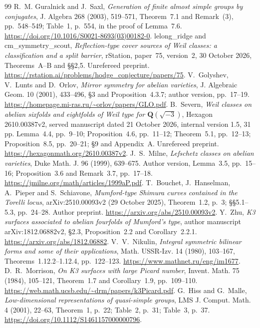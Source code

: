 \documentclass[11pt]{article}
\theoremstyle{definition}
\theoremstyle{remark}
\newcommand{\Q}{\mathbf Q}
\begin{document}
\begin{thebibliography}{99}
 R.~M. Guralnick and J.~Saxl, \emph{Generation of finite almost simple groups by conjugates}, J. Algebra 268 (2003), 519--571, Theorem~7.1 and Remark~(3), pp.~548--549; Table~1, p.~554, in the proof of Lemma~7.6. \url{https://doi.org/10.1016/S0021-8693(03)00182-0}.
 lelong\_ridge and cm\_symmetry\_scout, \emph{Reflection-type cover sources of Weil classes: a classification and a split barrier}, rStation, paper~75, version~2, 30 October 2026, Theorems~A--B and \S\S2,5. Unrefereed preprint. \url{https://rstation.ai/problems/hodge_conjecture/papers/75}.
 V.~Golyshev, V.~Lunts and D.~Orlov, \emph{Mirror symmetry for abelian varieties}, J. Algebraic Geom. 10 (2001), 433--496, \S3 and Proposition~4.3.7; author version, pp.~17--19. \url{https://homepage.mi-ras.ru/~orlov/papers/GLO.pdf}.
 B.~Severn, \emph{Weil classes on abelian sixfolds and eightfolds of Weil type for $\Q(\sqrt{-3})$}, Hexagon 2610.00387v2, served manuscript dated 21 October 2026, internal version 1.5, 31 pp. Lemma~4.4, pp.~9--10; Proposition~4.6, pp.~11--12; Theorem~5.1, pp.~12--13; Proposition~8.5, pp.~20--21; \S9 and Appendix~A. Unrefereed preprint. \url{https://hexagonmath.org/2610.00387v2}.
 J.~S.~Milne, \emph{Lefschetz classes on abelian varieties}, Duke Math. J. 96 (1999), 639--675. Author version, Lemma~3.5, pp.~15--16; Proposition~3.6 and Remark~3.7, pp.~17--18. \url{https://jmilne.org/math/articles/1999aP.pdf}.
 T.~Bouchet, J.~Hanselman, A.~Pieper and S.~Schiavone, \emph{Mumford-type Shimura curves contained in the Torelli locus}, arXiv:2510.00093v2 (29 October 2025), Theorem~1.2, p.~3; \S\S5.1--5.3, pp.~24--28. Author preprint. \url{https://arxiv.org/abs/2510.00093v2}.
 Y.~Zhu, \emph{K3 surfaces associated to abelian fourfolds of Mumford's type}, author manuscript arXiv:1812.06882v2, \S2.3, Proposition~2.2 and Corollary~2.2.1. \url{https://arxiv.org/abs/1812.06882}.
 V.~V.~Nikulin, \emph{Integral symmetric bilinear forms and some of their applications}, Math. USSR-Izv. 14 (1980), 103--167, Theorems~1.12.2--1.12.4, pp.~122--123. \url{https://www.mathnet.ru/eng/im1677}.
 D.~R.~Morrison, \emph{On K3 surfaces with large Picard number}, Invent. Math. 75 (1984), 105--121, Theorem~1.7 and Corollary~1.9, pp.~109--110. \url{https://web.math.ucsb.edu/~drm/papers/k3Picard.pdf}.
 G.~Hiss and G.~Malle, \emph{Low-dimensional representations of quasi-simple groups}, LMS J. Comput. Math. 4 (2001), 22--63, Theorem~1, p.~22; Table~2, p.~31; Table~3, p.~37. \url{https://doi.org/10.1112/S1461157000000796}.

\end{thebibliography}
\end{document}
